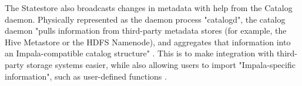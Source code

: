 \documentclass[onecolumn, draftclsnofoot,10pt, compsoc]{IEEEtran}
\begin{document}
The Statestore also broadcasts changes in metadata with help from the Catalog daemon.
Physically represented as the daemon process "catalogd", the catalog daemon "pulls information from third-party metadata stores (for example, the Hive Metastore or the HDFS Namenode), and aggregates that information into an Impala-compatible catalog structure" \cite{Impala}. 
This is to make integration with third-party storage systems easier, while also allowing users to import "Impala-specific information", such as user-defined functions \cite{Impala}.
	
\nocite{*}


\end{document}
